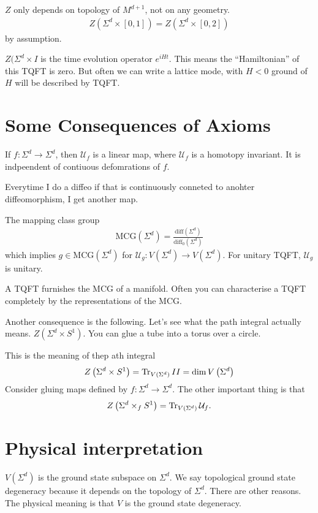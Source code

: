 $Z$ only depends on topology of $M^{d+1}$,
not on any geometry.
\begin{align}
    Z(\Sigma^d\times [0,1])
    = Z(\Sigma^d\times[0,2])
\end{align}
by assumption.

$Z(\Sigma^d\times I$ is the time evolution operator $e^{iHt}$.
This means the ``Hamiltonian'' of this TQFT is zero.
But often we can write a lattice mode,
with $H<0$ ground of $H$ will be described by TQFT.
\section{Some Consequences of Axioms}
\begin{proposition}
    If $f:\Sigma^d\to\Sigma^d$,
    then $\mathcal{U}_f$ is a linear map,
    where $\mathcal{U}_f$ is a homotopy invariant.
    It is indpeendent of contiuous defomrations of $f$.
\end{proposition}
Everytime I do a diffeo if that is continuously conneted to anohter
diffeomorphism,
I get another map.

The mapping class group
\begin{align}
    \mathrm{MCG}\left( \Sigma^d \right)
    = \frac{\mathrm{diff}\left( \Sigma^d \right)}{\mathrm{diff}_0\left( \Sigma^d
    \right)}
\end{align}
which implies $g\in \mathrm{MCG}\left( \Sigma^d \right)$
for $\mathcal{U}_g:V(\Sigma^d) \to V(\Sigma^d)$.
For unitary TQFT,
$\mathcal{U}_g$ is unitary.

A TQFT furnishes the MCG of a manifold.
Often you can characterise a TQFT completely by the representations of the MCG.

Another consequence is the following.
Let's see what the path integral actually means.
$Z(\Sigma^d\times S^1)$.
You can glue a tube into a torus over a circle.

This is the meaning of thep ath integral
\begin{align}
    Z\left( \Sigma^d\times S^1 \right)
    = \Tr_{V\left( \Sigma^d \right)} II
    = \dim V\left( \Sigma^d \right)
\end{align}
Consider gluing maps defined by
$f: \Sigma^d \to \Sigma^d$.
The other important thing is that
\begin{align}
    Z\left( \Sigma^d \times_f S^1 \right)
    = \Tr_{V\left( \Sigma^d \right)}\mathcal{U}_f.
\end{align}

\section{Physical interpretation}
$V(\Sigma^d)$ is the ground state subspace on $\Sigma^d$.
We say topological ground state degeneracy
because it depends on the topology of $\Sigma^d$.
There are other reasons.
The physical meaning is that $V$ is the ground state degeneracy.

